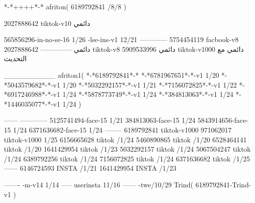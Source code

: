 *-*++++*-*
afriton(
6189792841 /8/8
)

2027888642 tiktok-v10
دائمي

565856296-in-no-se-16 1/26
-lse-ins-v1 12/21
------------
5754454119 facbook-v8
دائمي
--------------
2027888642 tiktok-v8
دائمي
5909533996 tiktok-v1000
دائمي مع التحديث

__________
afriton1(
*-*6189792841*-*
*-*6781967651*-*-v1 1/20
*-*5043579682*-*-v1 1/20
*-*5032292157*-*-v1 1/21
*-*7156072825*-*-v1 1/22
*-*6917246988*-*-v1 1/24
*-*5878773749*-*-v1 1/24
*-*384813063*-*-v1 1/24
*-*1446035077*-*-v1 1/24
)

------
------------
5125741494-face-15 1/21
384813063-face-15 1/24
5843914656-face-15 1/24
6371636682-face-15 1/24
--------
6189792841 tiktok-v1000
971062017 tiktok-v1000 1/25
6156665628 tiktok /1/24
5460890865 tiktok /1/20
6528464141 tiktok /1/20
1641429954 tiktok /1/23
5032292157 tiktok /1/24
5067504247 tiktok /1/24
6389792256 tiktok /1/24
7156072825 tiktok /1/24
6371636682 tiktok /1/25
------
6146724593 INSTA /1/21
1641429954 INSTA /1/23

-------
-m-v14 1/14
-----
userinsta 11/16
------
-twe/10/29
Trind(
6189792841-Trind-v1 
)
